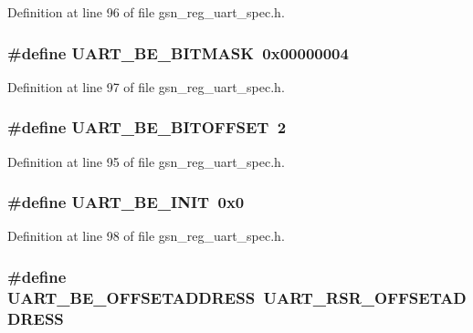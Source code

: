 Definition at line 96 of file gsn\_\-reg\_\-uart\_\-spec.h.

\hypertarget{a00575_a8c55436bf75dc0e8eb1545abd50e0cc7}{
\subsubsection[{UART\_\-BE\_\-BITMASK}]{\setlength{\rightskip}{0pt plus 5cm}\#define UART\_\-BE\_\-BITMASK~0x00000004}}
\label{a00575_a8c55436bf75dc0e8eb1545abd50e0cc7}


Definition at line 97 of file gsn\_\-reg\_\-uart\_\-spec.h.

\hypertarget{a00575_a372c9a75a36ae419506f2c039f87dd14}{
\subsubsection[{UART\_\-BE\_\-BITOFFSET}]{\setlength{\rightskip}{0pt plus 5cm}\#define UART\_\-BE\_\-BITOFFSET~2}}
\label{a00575_a372c9a75a36ae419506f2c039f87dd14}


Definition at line 95 of file gsn\_\-reg\_\-uart\_\-spec.h.

\hypertarget{a00575_af99e315ebcb0fed24eaf47c02898499f}{
\subsubsection[{UART\_\-BE\_\-INIT}]{\setlength{\rightskip}{0pt plus 5cm}\#define UART\_\-BE\_\-INIT~0x0}}
\label{a00575_af99e315ebcb0fed24eaf47c02898499f}


Definition at line 98 of file gsn\_\-reg\_\-uart\_\-spec.h.

\hypertarget{a00575_ab675e449cf8031b09a53dfdb269aa3c8}{
\subsubsection[{UART\_\-BE\_\-OFFSETADDRESS}]{\setlength{\rightskip}{0pt plus 5cm}\#define UART\_\-BE\_\-OFFSETADDRESS~UART\_\-RSR\_\-OFFSETADDRESS}}
\label{a00575_ab675e449cf8031b09a53dfdb269aa3c8}


